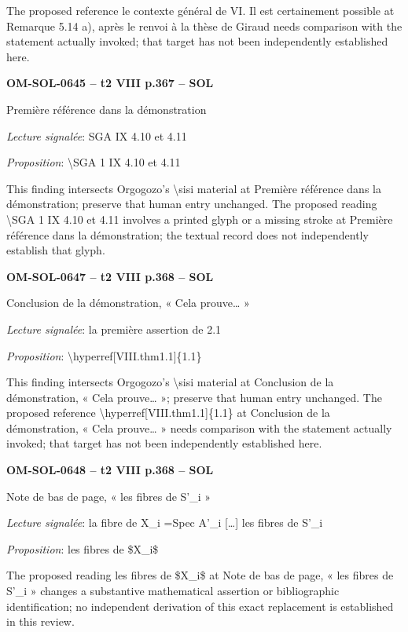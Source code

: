 The proposed reference le contexte général de VI. Il est certainement possible at Remarque 5.14 a), après le renvoi à la thèse de Giraud needs comparison with the statement actually invoked; that target has not been independently established here.\par
\par\noindent\textbf{OM-SOL-0645 -- t2 VIII p.367 -- SOL}\par
Première référence dans la démonstration\par
\emph{Lecture signalée}: SGA IX 4.10 et 4.11\par
\emph{Proposition}: \textbackslash{}SGA 1 IX 4.10 et 4.11\par
This finding intersects Orgogozo's \textbackslash{}sisi material at Première référence dans la démonstration; preserve that human entry unchanged. The proposed reading \textbackslash{}SGA 1 IX 4.10 et 4.11 involves a printed glyph or a missing stroke at Première référence dans la démonstration; the textual record does not independently establish that glyph.\par
\par\noindent\textbf{OM-SOL-0647 -- t2 VIII p.368 -- SOL}\par
Conclusion de la démonstration, « Cela prouve… »\par
\emph{Lecture signalée}: la première assertion de 2.1\par
\emph{Proposition}: \textbackslash{}hyperref[VIII.thm1.1]\{1.1\}\par
This finding intersects Orgogozo's \textbackslash{}sisi material at Conclusion de la démonstration, « Cela prouve… »; preserve that human entry unchanged. The proposed reference \textbackslash{}hyperref[VIII.thm1.1]\{1.1\} at Conclusion de la démonstration, « Cela prouve… » needs comparison with the statement actually invoked; that target has not been independently established here.\par
\par\noindent\textbf{OM-SOL-0648 -- t2 VIII p.368 -- SOL}\par
Note de bas de page, « les fibres de S'\_i »\par
\emph{Lecture signalée}: la fibre de X\_i =\allowbreak  Spec A'\_i […] les fibres de S'\_i\par
\emph{Proposition}: les fibres de \$X\_i\$\par
The proposed reading les fibres de \$X\_i\$ at Note de bas de page, « les fibres de S'\_i » changes a substantive mathematical assertion or bibliographic identification; no independent derivation of this exact replacement is established in this review.\par

